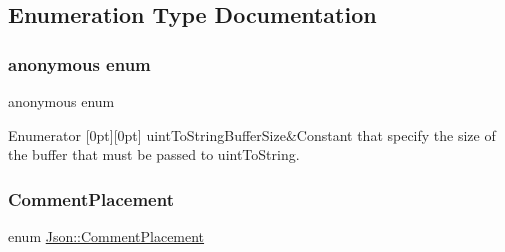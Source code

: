 \subsection{Enumeration Type Documentation}
\mbox{\label{namespaceJson_a2aacab54ef6fc18e833fbd4982a0a23a_a2aacab54ef6fc18e833fbd4982a0a23a}} 
\subsubsection{\texorpdfstring{anonymous enum}{anonymous enum}}
{\footnotesize\ttfamily anonymous enum}

\begin{DoxyEnumFields}{Enumerator}
[0pt][0pt]{}\mbox{\label{namespaceJson_a2aacab54ef6fc18e833fbd4982a0a23a_a2aacab54ef6fc18e833fbd4982a0a23aae4f2008c7919f20d81286121d1374424}} 
uint\+To\+String\+Buffer\+Size&Constant that specify the size of the buffer that must be passed to uint\+To\+String. \\
\hline

\end{DoxyEnumFields}
\mbox{\label{namespaceJson_a4fc417c23905b2ae9e2c47d197a45351_a4fc417c23905b2ae9e2c47d197a45351}} 
\subsubsection{\texorpdfstring{Comment\+Placement}{CommentPlacement}}
{\footnotesize\ttfamily enum \hyperlink{namespaceJson_a4fc417c23905b2ae9e2c47d197a45351_a4fc417c23905b2ae9e2c47d197a45351}{Json\+::\+Comment\+Placement}}

